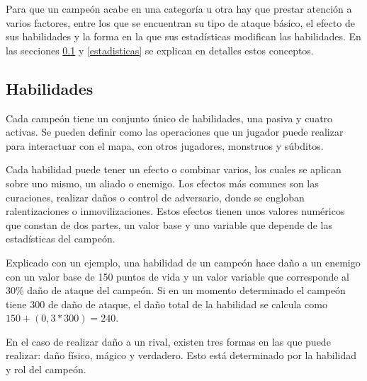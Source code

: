 Para que un campeón acabe en una categoría u otra hay que prestar atención a varios factores, entre los que se encuentran su tipo de ataque básico, el efecto de sus habilidades y la forma en la que sus estadísticas modifican las habilidades. En las secciones \ref{habilidades} y \ref{estadisticas} se explican en detalles estos conceptos.

\subsection{Habilidades}
\label{habilidades}
Cada campeón tiene un conjunto único de habilidades, una pasiva y cuatro activas. Se pueden definir como las operaciones que un jugador puede realizar para interactuar con el mapa, con otros jugadores, monstruos y súbditos.

Cada habilidad puede tener un efecto o combinar varios, los cuales se aplican sobre uno mismo, un aliado o enemigo. Los efectos más comunes son las curaciones, realizar daños o control de adversario, donde se engloban ralentizaciones o inmovilizaciones. Estos efectos tienen unos valores numéricos que constan de dos partes, un valor base y uno variable que depende de las estadísticas del campeón.

Explicado con un ejemplo, una habilidad de un campeón hace daño a un enemigo con un valor base de 150 puntos de vida y un valor variable que corresponde al 30\% daño de ataque del campeón. Si en un momento determinado el campeón tiene 300 de daño de ataque, el daño total de la habilidad se calcula como $150 + (0,3 * 300) = 240$.

En el caso de realizar daño a un rival, existen tres formas en las que puede realizar: daño físico, mágico y verdadero. Esto está determinado por la habilidad y rol del campeón.

